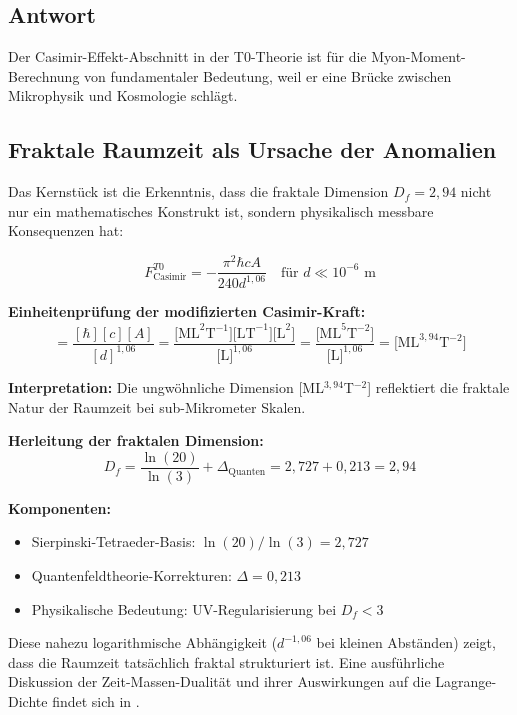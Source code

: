\documentclass[12pt,a4paper]{article}
\theoremstyle{remark}
\newenvironment{answer}{\subsection*{Antwort}}{\vspace{1em}}
\begin{document}
\begin{answer}
	Der Casimir-Effekt-Abschnitt in der T0-Theorie ist für die Myon-Moment-Berechnung von fundamentaler Bedeutung, weil er eine Brücke zwischen Mikrophysik und Kosmologie schlägt.
	
	\subsection{Fraktale Raumzeit als Ursache der Anomalien}
	
	Das Kernstück ist die Erkenntnis, dass die fraktale Dimension $D_f = 2{,}94$ nicht nur ein mathematisches Konstrukt ist, sondern physikalisch messbare Konsequenzen hat:
	
	\begin{equation}
		F_{\text{Casimir}}^{T0} = -\frac{\pi^2 \hbar c A}{240 d^{1{,}06}} \quad \text{für } d \ll 10^{-6} \text{ m}
	\end{equation}
	
	\begin{units}
		\textbf{Einheitenprüfung der modifizierten Casimir-Kraft:}
		\begin{equation}
			[F_{\text{Casimir}}^{T0}] = \frac{[\hbar][c][A]}{[d]^{1{,}06}} = \frac{\text{[ML}^2\text{T}^{-1}\text{][LT}^{-1}\text{][L}^2\text{]}}{\text{[L]}^{1{,}06}} = \frac{\text{[ML}^5\text{T}^{-2}\text{]}}{\text{[L]}^{1{,}06}} = \text{[ML}^{3{,}94}\text{T}^{-2}\text{]}
		\end{equation}
		
		\textbf{Interpretation:} Die ungwöhnliche Dimension [ML$^{3{,}94}$T$^{-2}$] reflektiert die fraktale Natur der Raumzeit bei sub-Mikrometer Skalen.
	\end{units}
	
	\textbf{Herleitung der fraktalen Dimension:}
	\begin{equation}
		D_f = \frac{\ln(20)}{\ln(3)} + \Delta_{\text{Quanten}} = 2{,}727 + 0{,}213 = 2{,}94
	\end{equation}
	
	\textbf{Komponenten:}
	\begin{itemize}
		\item Sierpinski-Tetraeder-Basis: $\ln(20)/\ln(3) = 2{,}727$
		\item Quantenfeldtheorie-Korrekturen: $\Delta = 0{,}213$
		\item Physikalische Bedeutung: UV-Regularisierung bei $D_f < 3$
	\end{itemize}
	
	Diese nahezu logarithmische Abhängigkeit ($d^{-1{,}06}$ bei kleinen Abständen) zeigt, dass die Raumzeit tatsächlich fraktal strukturiert ist. Eine ausführliche Diskussion der Zeit-Massen-Dualität und ihrer Auswirkungen auf die Lagrange-Dichte findet sich in \cite{pascher_lagrangian_2025}.
	

\end{answer}
\end{document}
